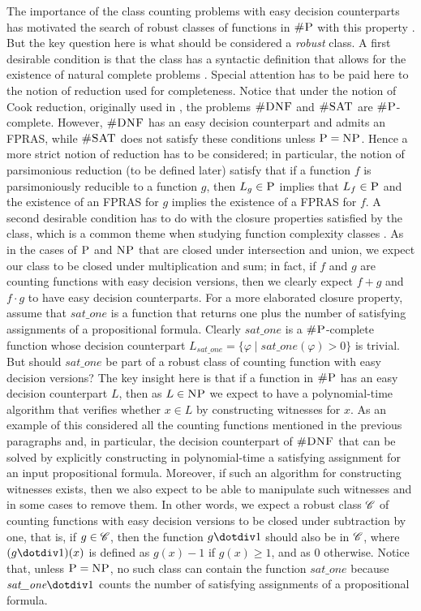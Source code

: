 The importance of the class counting problems with easy decision counterparts has motivated the search of robust classes of functions in $\text{\sc \#P}$ with this property \cite{PagourtzisZ06}. But the key question here is what should be considered a {\em robust} class. A first desirable condition is that the class has a syntactic definition that allows for the existence of natural complete problems \cite{P94}. Special attention has to be paid here to the notion of reduction used for completeness. Notice that under the notion of Cook reduction, originally used in \cite{Valiant79}, the problems $\textsc{\#DNF}$ and $\textsc{\#SAT}$ are $\text{\sc \#P}$-complete. However, $\textsc{\#DNF}$ has an easy decision counterpart and admits an FPRAS, while $\textsc{\#SAT}$ does not satisfy these conditions unless $\text{\sc P} = \text{\sc NP}$. Hence a more strict notion of reduction has to be considered; in particular, the notion of parsimonious reduction (to be defined later) satisfy that if a function $f$ is parsimoniously reducible to a function $g$, then $L_g \in \text{\sc P}$ implies that $L_f \in \text{\sc P}$ and the existence of an FPRAS for $g$ implies the existence of a FPRAS for $f$. 
A second desirable condition has to do with the closure properties satisfied by the class, which is a common theme when studying function complexity classes \cite{OH93,FH08}. As in the cases of $\text{\sc P}$ and $\text{\sc NP}$ that are closed under intersection and union, we expect our class to be closed under multiplication and sum; in fact, if $f$ and $g$ are counting functions with easy decision versions, then we clearly expect $f + g$ and $f \cdot g$ to have easy decision counterparts. For a more elaborated closure property, assume that $\textit{sat\_one}$ is a function that returns one plus the number of satisfying assignments of a propositional formula. Clearly $\textit{sat\_one}$ is a $\text{\sc \#P}$-complete function whose decision counterpart $L_{\textit{sat\_one}} = \{ \varphi \mid \textit{sat\_one}(\varphi) > 0 \}$ is trivial. But should $\textit{sat\_one}$ be part of a robust class of counting function with easy decision versions? The key insight here is that if a function in $\text{\sc \#P}$ has an easy decision counterpart $L$, then as $L \in \text{\sc NP}$ we expect  to have a polynomial-time algorithm that verifies whether $x \in L$ by constructing witnesses for $x$. As an example of this considered all the counting functions mentioned in the previous paragraphs and, in particular, the decision counterpart of $\textsc{\#DNF}$ that can be solved by explicitly constructing in polynomial-time a satisfying assignment for an input propositional formula. Moreover, if such an algorithm for constructing witnesses exists, then we also expect to be able to manipulate such witnesses and in some cases to remove them. In other words, we expect a robust class $\mathscr{C}$ of counting functions with easy decision versions to be closed under subtraction by one, that is, if $g \in \mathscr{C}$, then the function $g \dotdiv 1$ should also be in $\mathscr{C}$, where $(g \dotdiv 1)(x)$ is defined as $g(x) - 1$ if $g(x) \geq 1$, and as $0$ otherwise. Notice that, unless $\text{\sc P} = \text{\sc NP}$, no such class can contain the function $\textit{sat\_one}$ because $\textit{sat\_one} \dotdiv 1$ counts the number of satisfying assignments of a propositional formula. 

